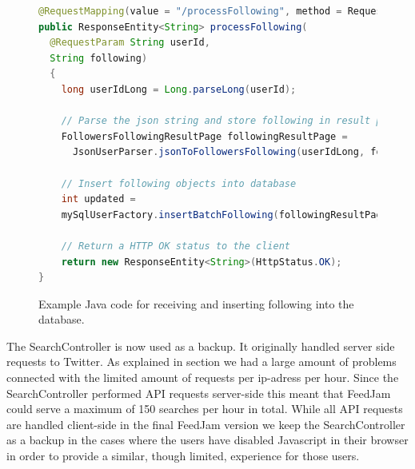 \begin{figure}[h!]
\begin{lstlisting}[language=java]
@RequestMapping(value = "/processFollowing", method = RequestMethod.POST)
public ResponseEntity<String> processFollowing(
  @RequestParam String userId,
  String following) 
  {
    long userIdLong = Long.parseLong(userId);
    
    // Parse the json string and store following in result page object
    FollowersFollowingResultPage followingResultPage = 
      JsonUserParser.jsonToFollowersFollowing(userIdLong, following);
    
    // Insert following objects into database
    int updated = 
    mySqlUserFactory.insertBatchFollowing(followingResultPage);

    // Return a HTTP OK status to the client				
    return new ResponseEntity<String>(HttpStatus.OK);
}
\end{lstlisting}
\caption{Example Java code for receiving and inserting following into the database.}
\label{javaProcessFollowing}
\end{figure}

The SearchController is now used as a backup. It originally handled server side requests to Twitter. As explained in section \label{twitterProblem} we had a large amount of problems connected with the limited amount of requests per ip-adress per hour. Since the SearchController performed API requests server-side this meant that FeedJam could serve a maximum of 150 searches per hour in total. While all API requests are handled client-side in the final FeedJam version we keep the SearchController as a backup in the cases where the users have disabled Javascript in their browser in order to provide a similar, though limited, experience for those users.


